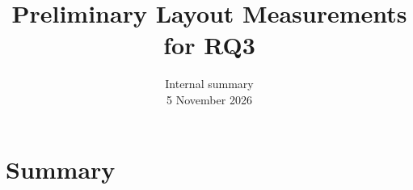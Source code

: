 \documentclass[letterpaper,twocolumn,10pt]{article}
\begin{document}
\title{Preliminary Layout Measurements for RQ3}
\author{Internal summary\\5 November 2026}
\date{}
\maketitle
\section{Summary}

\end{document}
